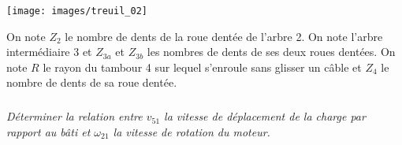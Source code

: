 \documentclass[10pt,fleqn]{article} %
\begin{document}
\begin{multicols}{2}
\begin{multicols}{2}
\begin{center}
\texttt{[image: images/treuil\_02]}
\end{center}

On note $Z_2$ le nombre de dents de la roue dentée de l'arbre 2. On note l'arbre intermédiaire 3 et $Z_{3a}$ et $Z_{3b}$ les nombres de dents de ses deux roues dentées. On note $R$ le rayon du tambour 4 sur lequel s’enroule sans glisser un câble et $Z_4$ le nombre de dents de sa roue dentée.


\subparagraph{}
\textit{Déterminer la relation entre $v_{51}$ la vitesse de déplacement de la charge par rapport au bâti et $\omega_{21}$ la vitesse de
rotation du moteur.}

\ifprof
\end{multicols}
\else
\end{multicols}
\fi
\end{document}
